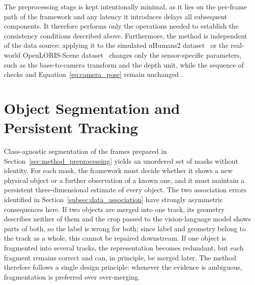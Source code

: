 {\small The preprocessing stage is kept intentionally minimal, as it lies on the per-frame path of the framework and any latency it introduces delays all subsequent components. It therefore performs only the operations needed to establish the consistency conditions described above. Furthermore, the method is independent of the data source: applying it to the simulated uHumans2 dataset~\cite{rosinol2021kimera} or the real-world OpenLORIS-Scene dataset~\cite{shi2020openloris} changes only the sensor-specific parameters, such as the base-to-camera transform and the depth unit, while the sequence of checks and Equation~\eqref{eq:camera_pose} remain unchanged .\par}


























\section{Object Segmentation and Persistent Tracking}
\label{sec:method_tracking}
{\small
Class-agnostic segmentation of the frames prepared in Section~\ref{sec:method_preprocessing} yields an unordered set of masks without identity. For each mask, the framework must decide whether it shows a new physical object or a further observation of a known one, and it must maintain a persistent three-dimensional estimate of every object. The two association errors identified in Section~\ref{subsec:data_association} have strongly asymmetric consequences here. If two objects are merged into one track, its geometry describes neither of them and the crop passed to the vision-language model shows parts of both, so the label is wrong for both; since label and geometry belong to the track as a whole, this cannot be repaired downstream. If one object is fragmented into several tracks, the representation becomes redundant, but each fragment remains correct and can, in principle, be merged later. The method therefore follows a single design principle: whenever the evidence is ambiguous, fragmentation is preferred over over-merging.
\par}

